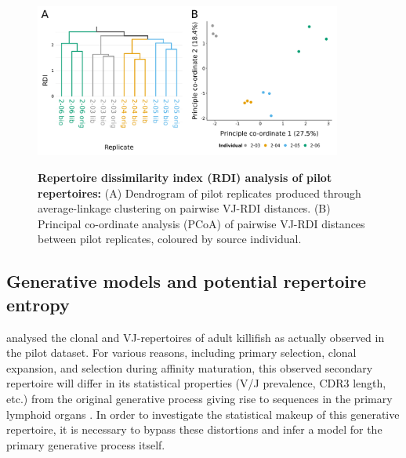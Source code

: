 \begin{figure}
\centering
\includegraphics[width = 0.9\textwidth]{_Figures/png/pilot-rdi-vj-replicate}
\begin{subfigure}{0em}
\label{fig:igseq-pilot-rdi-dendrogram}
\end{subfigure}
\begin{subfigure}{0em}
\label{fig:igseq-pilot-rdi-pcoa}
\end{subfigure}
\caption[Repertoire dissimilarity index (RDI) analysis of \igseq pilot repetoires]{\textbf{Repertoire dissimilarity index (RDI) analysis of \igseq pilot repertoires:} (A) Dendrogram of pilot replicates produced through average-linkage clustering on pairwise VJ-RDI distances. (B) Principal co-ordinate analysis (PCoA) of pairwise VJ-RDI distances between pilot replicates, coloured by source individual.}
\label{fig:igseq-pilot-rdi}
\end{figure}

\subsection{Generative models and potential repertoire entropy}
\label{sec:igseq_pilot_generative}

 analysed the clonal and VJ-repertoires of adult killifish as actually observed in the pilot dataset. For various reasons, including primary selection, clonal expansion, and selection during affinity maturation, this observed secondary repertoire will differ in its statistical properties (V/J prevalence, CDR3 length, etc.) from the original generative process giving rise to \igh{} sequences in the primary lymphoid organs \parencite{elhanati2015model}. In order to investigate the statistical makeup of this generative repertoire, it is necessary to bypass these distortions and infer a model for the primary generative process itself.


